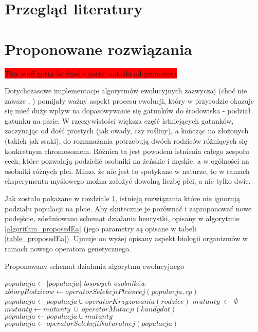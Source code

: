 \documentclass[twoside]{iisthesis}
\newcommand{\todo}{\colorbox{red}}
\begin{document}
\chapter{Przegląd literatury} \label{chapter_literature}
\chapter{Proponowane rozwiązania} \label{chapter_proposed}
\todo{This stuff gotta be fixed - patrz: notatki od promotora}

Dotychczasowe implementacje algorytmów ewolucyjnych zazwyczaj (choć nie zawsze \cite{GGA}, \cite{SexualGA}) pomijały ważny aspekt procesu ewolucji, który w przyrodzie okazuje się mieć duży wpływ na dopasowywanie się gatunków do środowiska - podział gatunku na płcie. W rzeczywistości większa część istniejących gatunków, zaczynając od dość prostych (jak owady, czy rośliny), a kończąc na złożonych (takich jak ssaki), do rozmnażania potrzebują dwóch rodziców różniących się konkretnym chromosomem. Różnica ta jest powodem istnienia całego zespołu cech, które pozwalają podzielić osobniki na żeńskie i męskie, a w ogólności na osobniki różnych płci. Mimo, że nie jest to spotykane w naturze, to w ramach eksperymentu myślowego można założyć dowolną liczbę płci, a nie tylko dwie.

Jak zostało pokazane w rozdziale \ref{chapter_literature}, istnieją rozwiązania które nie ignorują podziału populacji na płcie. Aby skutecznie je porównać i zaproponować nowe podejście, zdefiniowano schemat działania heurystki, opisany w algorytmie \ref{algorithm_proposedEa} (jego parametry są opisane w tabeli \ref{table_proposedEa}). Ujmuje on wyżej opisany aspekt biologii organizmów w ramach nowego operatora genetycznego.

\begin{algorithm}
	\caption{Proponowany schemat działania algorytmu ewolucyjnego}
	\label{algorithm_proposedEa}
	\begin{algorithmic}[1]
		\Var $populacja \gets |populacja|$ \textit{losowych osobników}
		\Var $zbioryRodzicow \gets operatorSelekcjiPlciowej(populacja, cp)$
		\State $populacja \gets populacja \cup operatorKrzyzowania(rodzice)$
		\EndFor
		\Var $mutanty\ \gets\ \emptyset$
		\State $mutanty \gets mutanty\ \cup\ operatorMutacji(kandydat)$
		\EndIf
		\EndFor
		\State $populacja \gets populacja \cup mutanty$    
		\State $populacja \gets operatorSelekcjiNaturalnej(populacja)$
		\EndWhile  
		\EndProcedure
	\end{algorithmic}
\end{algorithm}
\end{document}
